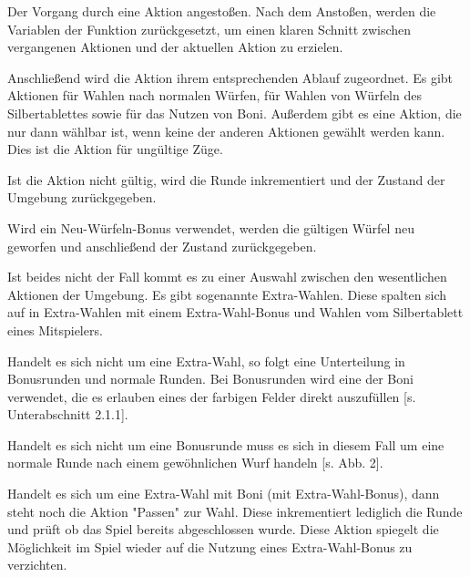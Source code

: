 Der Vorgang durch eine Aktion angestoßen. Nach dem Anstoßen, werden die Variablen der Funktion zurückgesetzt, um einen klaren Schnitt zwischen vergangenen Aktionen und der aktuellen Aktion zu erzielen.

Anschließend wird die Aktion ihrem entsprechenden Ablauf zugeordnet. Es gibt Aktionen für Wahlen nach normalen Würfen, für Wahlen von Würfeln des Silbertablettes sowie für das Nutzen von Boni. Außerdem gibt es eine Aktion, die nur dann wählbar ist, wenn keine der anderen Aktionen gewählt werden kann. Dies ist die Aktion für ungültige Züge.

Ist die Aktion nicht gültig, wird die Runde inkrementiert und der Zustand der Umgebung zurückgegeben.

Wird ein Neu-Würfeln-Bonus verwendet, werden die gültigen Würfel neu geworfen und anschließend der Zustand zurückgegeben.

Ist beides nicht der Fall kommt es zu einer Auswahl zwischen den wesentlichen Aktionen der Umgebung. Es gibt sogenannte Extra-Wahlen. Diese spalten sich auf in Extra-Wahlen mit einem Extra-Wahl-Bonus und Wahlen vom Silbertablett eines Mitspielers.

Handelt es sich nicht um eine Extra-Wahl, so folgt eine Unterteilung in Bonusrunden und normale Runden. Bei Bonusrunden wird eine der Boni verwendet, die es erlauben eines der farbigen Felder direkt auszufüllen [s. Unterabschnitt 2.1.1].

Handelt es sich nicht um eine Bonusrunde muss es sich in diesem Fall um eine normale Runde nach einem gewöhnlichen Wurf handeln [s. Abb. 2].

Handelt es sich um eine Extra-Wahl mit Boni (mit Extra-Wahl-Bonus), dann steht noch die Aktion "Passen" zur Wahl. Diese inkrementiert lediglich die Runde und prüft ob das Spiel bereits abgeschlossen wurde. Diese Aktion spiegelt die Möglichkeit im Spiel wieder auf die Nutzung eines Extra-Wahl-Bonus zu verzichten.\\


